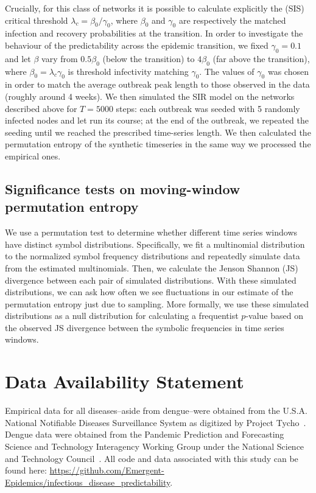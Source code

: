 \documentclass[fleqn,12pt]{wlscirep}
\begin{document}
Crucially, for this class of networks it is possible to calculate explicitly the (SIS) critical threshold $\lambda_c = \beta_0/\gamma_0$, where $\beta_0$ and $\gamma_0$ are respectively the matched infection and recovery probabilities at the transition. In order to investigate the behaviour of the predictability across the epidemic transition, we fixed $\gamma_0 = 0.1$ and let $\beta$ vary from $0.5 \beta_0$ (below the transition) to $4\beta_0$ (far above the transition), where $\beta_0 = \lambda_c \gamma_0$ is threshold infectivity matching $\gamma_0$. The values of $\gamma_0$ was chosen in order to match the average outbreak peak length to those observed in the data (roughly around 4 weeks). We then simulated the SIR model on the networks described above for $T=5000$ steps: each outbreak was seeded with 5 randomly infected nodes and let run its course; at the end of the outbreak, we repeated the seeding until we reached the prescribed time-series length. We then calculated the permutation entropy of the synthetic timeseries in the same way we processed the empirical ones.


\subsection*{Significance tests on moving-window permutation entropy}
We use a permutation test to determine whether different time series windows have distinct symbol distributions.  Specifically, we fit a multinomial distribution to the normalized symbol frequency distributions and repeatedly simulate data from the estimated multinomials.  Then, we calculate the Jenson Shannon (JS) divergence between each pair of simulated distributions.  With these simulated distributions, we can ask how often we see fluctuations in our estimate of the permutation entropy just due to sampling. More formally, we use these simulated distributions as a null distribution for calculating a frequentist $p$-value based on the observed JS divergence between the symbolic frequencies in time series windows.

\section*{Data Availability Statement}
Empirical data for all diseases--aside from dengue--were obtained from the U.S.A. National Notifiable Diseases Surveillance System as digitized by
Project Tycho~\cite{tycho}. Dengue data were obtained from the Pandemic Prediction and Forecasting Science and Technology Interagency Working Group under the National Science and Technology Council~\cite{denguedata}.  All code and data associated with this study can be found here: \url{https://github.com/Emergent-Epidemics/infectious_disease_predictability}.
\end{document}
